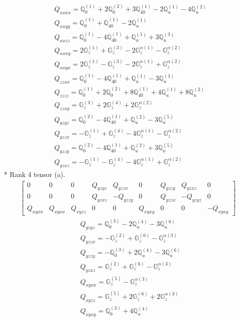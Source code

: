 \documentclass[fleqn,8pt,landscape]{jsarticle}
\begin{document}
\begin{align*}
& Q_{xxxx} = \mathbb{Q}_{0}^{(1)} + 2 \mathbb{Q}_{0}^{(2)} + 3 \mathbb{Q}_{40}^{(1)} - 2 \mathbb{Q}_{u}^{(1)} - 4 \mathbb{Q}_{u}^{(2)} \\
& Q_{xxyy} = \mathbb{Q}_{0}^{(1)} + \mathbb{Q}_{40}^{(1)} - 2 \mathbb{Q}_{u}^{(1)} \\
& Q_{xxzz} = \mathbb{Q}_{0}^{(1)} - 4 \mathbb{Q}_{40}^{(1)} + \mathbb{Q}_{u}^{(1)} + 3 \mathbb{Q}_{u}^{(3)} \\
& Q_{xxxy} = 2 \mathbb{G}_{z}^{(1)} + \mathbb{G}_{z}^{(3)} - 2 \mathbb{G}_{z}^{\alpha(1)} - \mathbb{G}_{z}^{\alpha(2)} \\
& Q_{xxyx} = 2 \mathbb{G}_{z}^{(1)} - \mathbb{G}_{z}^{(3)} - 2 \mathbb{G}_{z}^{\alpha(1)} + \mathbb{G}_{z}^{\alpha(2)} \\
& Q_{zzxx} = \mathbb{Q}_{0}^{(1)} - 4 \mathbb{Q}_{40}^{(1)} + \mathbb{Q}_{u}^{(1)} - 3 \mathbb{Q}_{u}^{(3)} \\
& Q_{zzzz} = \mathbb{Q}_{0}^{(1)} + 2 \mathbb{Q}_{0}^{(2)} + 8 \mathbb{Q}_{40}^{(1)} + 4 \mathbb{Q}_{u}^{(1)} + 8 \mathbb{Q}_{u}^{(2)} \\
& Q_{zzxy} = \mathbb{G}_{z}^{(3)} + 2 \mathbb{G}_{z}^{(4)} + 2 \mathbb{G}_{z}^{\alpha(2)} \\
& Q_{yzyz} = \mathbb{Q}_{0}^{(2)} - 4 \mathbb{Q}_{40}^{(1)} + \mathbb{Q}_{u}^{(2)} - 3 \mathbb{Q}_{u}^{(5)} \\
& Q_{yzzx} = - \mathbb{G}_{z}^{(1)} + \mathbb{G}_{z}^{(4)} - 4 \mathbb{G}_{z}^{\alpha(1)} - \mathbb{G}_{z}^{\alpha(2)} \\
& Q_{yzzy} = \mathbb{Q}_{0}^{(2)} - 4 \mathbb{Q}_{40}^{(1)} + \mathbb{Q}_{u}^{(2)} + 3 \mathbb{Q}_{u}^{(5)} \\
& Q_{yzxz} = - \mathbb{G}_{z}^{(1)} - \mathbb{G}_{z}^{(4)} - 4 \mathbb{G}_{z}^{\alpha(1)} + \mathbb{G}_{z}^{\alpha(2)}
\end{align*}
* Rank 4 tensor (a).
\begin{align*}
\begin{bmatrix} 0 & 0 & 0 & Q_{yzyz} & Q_{yzzx} & 0 & Q_{yzzy} & Q_{yzxz} & 0 \\ 0 & 0 & 0 & Q_{yzxz} & - Q_{yzzy} & 0 & Q_{yzzx} & - Q_{yzyz} & 0 \\ Q_{xyxx} & Q_{xyxx} & Q_{xyzz} & 0 & 0 & Q_{xyxy} & 0 & 0 & - Q_{xyxy} \end{bmatrix}
\end{align*}
\begin{align*}
& Q_{yzyz} = \mathbb{Q}_{0}^{(3)} - 2 \mathbb{Q}_{u}^{(4)} - 3 \mathbb{Q}_{u}^{(6)} \\
& Q_{yzzx} = - \mathbb{G}_{z}^{(2)} + \mathbb{G}_{z}^{(6)} - \mathbb{G}_{z}^{\alpha(3)} \\
& Q_{yzzy} = - \mathbb{Q}_{0}^{(3)} + 2 \mathbb{Q}_{u}^{(4)} - 3 \mathbb{Q}_{u}^{(6)} \\
& Q_{yzxz} = \mathbb{G}_{z}^{(2)} + \mathbb{G}_{z}^{(6)} - \mathbb{G}_{z}^{\alpha(3)} \\
& Q_{xyxx} = \mathbb{G}_{z}^{(5)} - \mathbb{G}_{z}^{\alpha(3)} \\
& Q_{xyzz} = \mathbb{G}_{z}^{(5)} + 2 \mathbb{G}_{z}^{(6)} + 2 \mathbb{G}_{z}^{\alpha(3)} \\
& Q_{xyxy} = \mathbb{Q}_{0}^{(3)} + 4 \mathbb{Q}_{u}^{(4)}
\end{align*}
\end{document}
